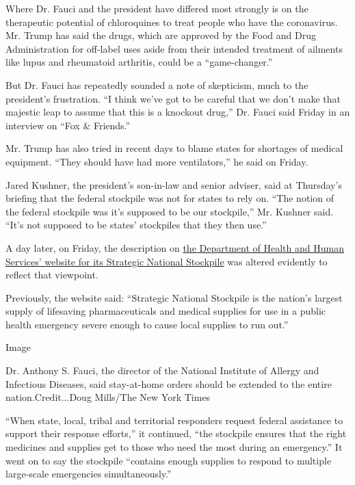 Where Dr. Fauci and the president have differed most strongly is on the
therapeutic potential of chloroquines to treat people who have the
coronavirus. Mr. Trump has said the drugs, which are approved by the
Food and Drug Administration for off-label uses aside from their
intended treatment of ailments like lupus and rheumatoid arthritis,
could be a ``game-changer.''

But Dr. Fauci has repeatedly sounded a note of skepticism, much to the
president's frustration. ``I think we've got to be careful that we don't
make that majestic leap to assume that this is a knockout drug,'' Dr.
Fauci said Friday in an interview on ``Fox \& Friends.''

Mr. Trump has also tried in recent days to blame states for shortages of
medical equipment. ``They should have had more ventilators,'' he said on
Friday.

Jared Kushner, the president's son-in-law and senior adviser, said at
Thursday's briefing that the federal stockpile was not for states to
rely on. ``The notion of the federal stockpile was it's supposed to be
our stockpile,'' Mr. Kushner said. ``It's not supposed to be states'
stockpiles that they then use.''

A day later, on Friday, the description on
\href{https://www.phe.gov/about/sns/Pages/default.aspx}{the Department
of Health and Human Services' website for its Strategic National
Stockpile} was altered evidently to reflect that viewpoint.

Previously, the website said: ``Strategic National Stockpile is the
nation's largest supply of lifesaving pharmaceuticals and medical
supplies for use in a public health emergency severe enough to cause
local supplies to run out.''

Image

Dr. Anthony S. Fauci, the director of the National Institute of Allergy
and Infectious Diseases, said stay-at-home orders should be extended to
the entire nation.Credit...Doug Mills/The New York Times

``When state, local, tribal and territorial responders request federal
assistance to support their response efforts,'' it continued, ``the
stockpile ensures that the right medicines and supplies get to those who
need the most during an emergency.'' It went on to say the stockpile
``contains enough supplies to respond to multiple large-scale
emergencies simultaneously.''

\href{https://www.nytimes.com/news-event/coronavirus?action=click\&pgtype=Article\&state=default\&region=MAIN_CONTENT_3\&context=storylines_faq}{}

